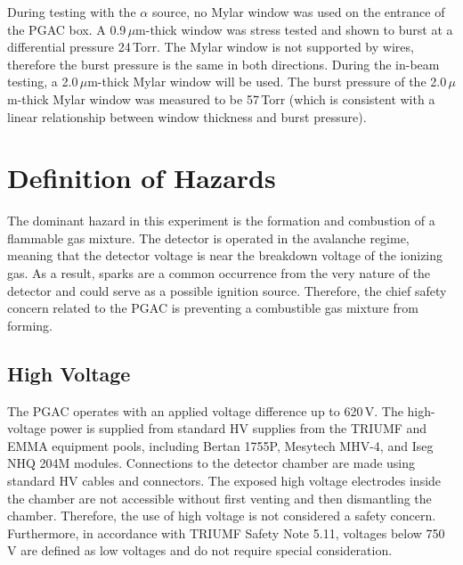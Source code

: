 During testing with the $\alpha$ source, no Mylar window was used on the entrance of the PGAC box.  A 0.9\,$\mu$m-thick window was stress tested and shown to burst at a differential pressure 24\,Torr.  The Mylar window is not supported by wires, therefore the burst pressure is the same in both directions.  During the in-beam testing, a  2.0\,$\mu$m-thick Mylar window will be used.  
The burst pressure of the 2.0\,$\mu$m-thick Mylar window was measured to be 57\,Torr (which is consistent with a linear relationship between window thickness and burst pressure).



\section{Definition of Hazards}
The dominant hazard in this experiment is the formation and combustion of a flammable gas
mixture.  The detector is operated in the avalanche regime, meaning that the detector voltage is near the breakdown voltage of the ionizing gas.  As a result, sparks are a common occurrence from the very nature of the detector and could serve as a possible ignition source.  Therefore, the chief safety concern related to the PGAC is preventing a combustible gas 
mixture from  forming.


\subsection{High Voltage}
The PGAC operates with an applied voltage difference up to 620\,V. The high-voltage power is supplied from standard HV supplies from the TRIUMF and EMMA equipment pools, including Bertan 1755P, Mesytech MHV-4, and Iseg NHQ 204M modules.  Connections to the detector chamber are made using standard HV cables and connectors. The exposed high voltage electrodes inside the chamber are not accessible without first venting and then dismantling the chamber.  Therefore, the use of high voltage is not considered a safety concern.  Furthermore, in accordance with TRIUMF Safety Note 5.11, voltages below 750\,V are defined as low voltages and do not require special consideration.
